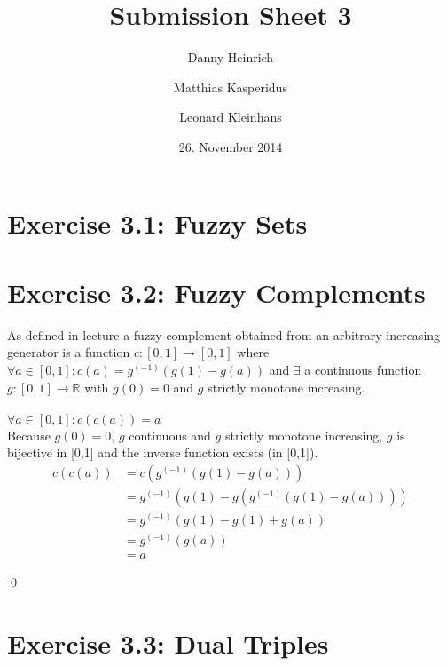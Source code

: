 \documentclass{scrartcl}
\title{Submission Sheet 3}
\author{Danny Heinrich \and Matthias Kasperidus \and Leonard Kleinhans}
\date{26. November 2014}
\begin{document}
\maketitle

\section{Exercise 3.1: Fuzzy Sets}

\section{Exercise 3.2: Fuzzy Complements}
As defined in lecture a fuzzy complement obtained from an arbitrary increasing generator is a function $c: [0,1] \to [0,1]$ where
$\forall a \in [0,1]: c(a) = g^{(-1)}\left(g(1)-g(a)\right)$ and $\exists$ a continuous function $g:[0,1] \to \mathds{R}$ with $g(0) = 0$ and $g$ strictly monotone increasing. \\
\\

 $\forall a \in [0,1]: c(c(a)) = a$ \\
Because $g(0) = 0$, $g$ continuous and $g$ strictly monotone increasing, $g$ is bijective in [0,1] and the inverse function exists (in [0,1]).
\begin{align*}
        c(c(a)) &= c \left( g^{(-1)} \left( g(1) - g(a) \right) \right) \\
                &= g^{(-1)} \left( g(1) - g \left( g^{(-1)} \left( g(1) - g(a) \right) \right) \right) \\
                &= g^{(-1)} \left( g(1)-g(1)+g(a) \right) \\
                &= g^{(-1)} \left( g(a) \right) \\
                &= a 
\end{align*}
    
\qed

\section{Exercise 3.3: Dual Triples}
\end{document}
